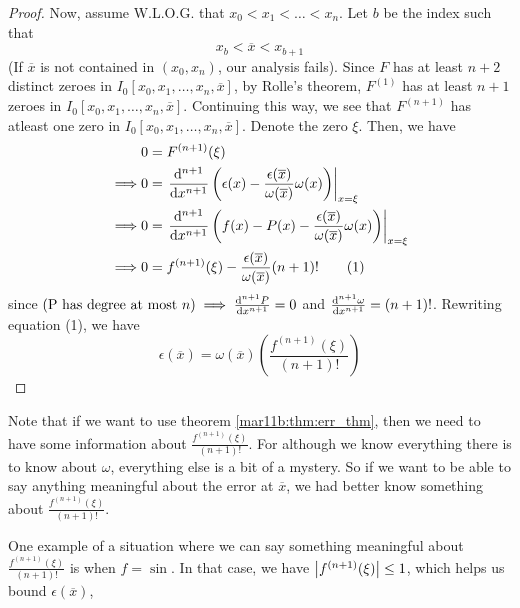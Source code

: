 \begin{proof}
  Now, assume W.L.O.G. that $x_0 < x_1 < \dots < x_n$. Let $b$ be the index such that
  \[
    x_b < \overline{x} < x_{b+1}
  \]
  (If $\overline{x}$ is not contained in $(x_0, x_n)$, our analysis fails). Since $F$ has at least $n+2$ distinct zeroes in $I_0[x_0, x_1, \dots ,x_n, \overline{x}]$, by Rolle's theorem, $F^{(1)}$ has at least $n+1$ zeroes in $I_0[x_0, x_1, \dots ,x_n, \overline{x}]$. Continuing this way, we see that $F^{(n+1)}$ has atleast one zero in $I_0[x_0, x_1, \dots ,x_n, \overline{x}]$. Denote the zero $\xi$. Then, we have
  \begin{align*}
    &0 = F^{(n+1)}(\xi) \\
    \implies&
              0 = \left.\dv[n+1]{x}\left(\epsilon(x) - \frac{\epsilon(\overline{x})}{\omega(\overline{x})}\omega(x) \right)\right|_{x = \xi} \\
    \implies&
              0 = \left.\dv[n+1]{x}\left(f(x) - P(x) - \frac{\epsilon(\overline{x})}{\omega(\overline{x})}\omega(x) \right)\right|_{x = \xi} \\
    \implies&
              0 = f^{(n+1)}(\xi) - \frac{\epsilon(\overline{x})}{\omega(\overline{x})}(n+1)! \tag{1}
  \end{align*}
  since $(\text{P has degree at most } n) \implies \dv[n+1]{P}{x} = 0$ and $\dv[n+1]{\omega}{x} = (n+1)!$. Rewriting equation (1), we have
  \[
    \epsilon(\overline{x}) = \omega(\overline{x})\left(\frac{f^{(n+1)}(\xi)}{(n+1)!}\right)
  \]
  \hfill
\end{proof}

Note that if we want to use theorem \ref{mar11b:thm:err_thm}, then we need to have some information about $\frac{f^{(n+1)}(\xi)}{(n+1)!}$. For although we know everything there is to know about $\omega$, everything else is a bit of a mystery. So if we want to be able to say anything meaningful about the error at $\overline{x}$, we had better know something about $\frac{f^{(n+1)}(\xi)}{(n+1)!}$.

One example of a situation where we can say something meaningful about $\frac{f^{(n+1)}(\xi)}{(n+1)!}$ is when $f = \sin$. In that case, we have $\abs{f^{(n+1)}(\xi)} \leq 1$, which helps us bound $\epsilon(\overline{x})$,
